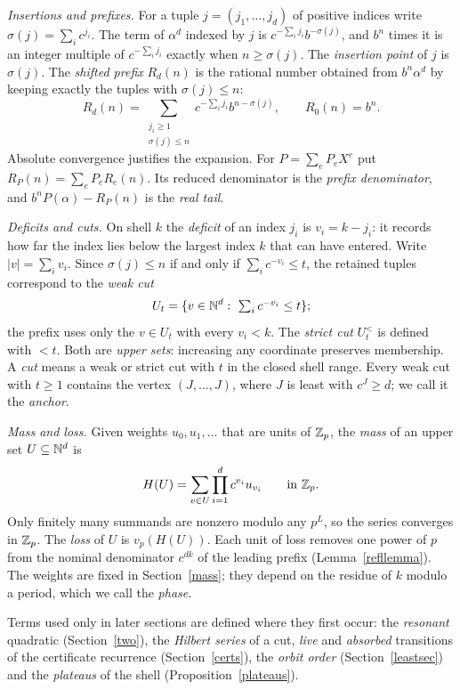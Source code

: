 \documentclass[11pt]{article}
\begin{document}
\emph{Insertions and prefixes.} For a tuple \(j=(j_1,\ldots,j_d)\) of
positive indices write \(\sigma(j)=\sum_i c^{j_i}\). The term of
\(\alpha^d\) indexed by \(j\) is \(c^{-\sum_ij_i}b^{-\sigma(j)}\), and
\(b^n\) times it is an integer multiple of \(c^{-\sum_ij_i}\) exactly when
\(n\ge\sigma(j)\). The \emph{insertion point} of \(j\) is \(\sigma(j)\).
The \emph{shifted prefix} \(R_d(n)\) is the rational number obtained from
\(b^n\alpha^d\) by keeping exactly the tuples with \(\sigma(j)\le n\):
\[
 R_d(n)=\sum_{\substack{j_i\ge1\\\sigma(j)\le n}}
             c^{-\sum_i j_i} b^{n-\sigma(j)},\qquad R_0(n)=b^n .
\]
Absolute convergence justifies the expansion. For \(P=\sum_e P_e X^e\)
put \(R_P(n)=\sum_e P_e R_e(n)\). Its reduced denominator is the
\emph{prefix denominator}, and \(b^nP(\alpha)-R_P(n)\) is the
\emph{real tail}.

\emph{Deficits and cuts.} On shell \(k\) the \emph{deficit} of an index
\(j_i\) is \(v_i=k-j_i\): it records how far the index lies below the
largest index \(k\) that can have entered. Write \(|v|=\sum_iv_i\). Since
\(\sigma(j)\le n\) if and only if \(\sum_ic^{-v_i}\le t\), the retained
tuples correspond to the \emph{weak cut}
\[
 U_t=\{v\in\mathbb N^d:\ \textstyle\sum_i c^{-v_i}\le t\};
\]
the prefix uses only the \(v\in U_t\) with every \(v_i<k\). The
\emph{strict cut} \(U_t^{<}\) is defined with \(<t\). Both are
\emph{upper sets}: increasing any coordinate preserves membership. A
\emph{cut} means a weak or strict cut with \(t\) in the closed shell
range. Every weak cut with \(t\ge1\) contains the vertex
\((J,\ldots,J)\), where \(J\) is least with \(c^J\ge d\); we call it the
\emph{anchor}.

\emph{Mass and loss.} Given weights \(u_0,u_1,\ldots\) that are units of
\(\mathbb Z_p\), the \emph{mass} of an upper set \(U\subseteq\mathbb N^d\) is
\[
 H(U)=\sum_{v\in U}\prod_{i=1}^d c^{v_i}u_{v_i}\qquad\text{in }\mathbb Z_p .
\]
Only finitely many summands are nonzero modulo any \(p^L\), so the series
converges in \(\mathbb Z_p\). The \emph{loss} of \(U\) is \(v_p(H(U))\). Each unit
of loss removes one power of \(p\) from the nominal denominator
\(c^{dk}\) of the leading prefix (Lemma~\ref{refllemma}). The weights are
fixed in Section~\ref{mass}; they depend on the residue of \(k\) modulo a
period, which we call the \emph{phase}.

Terms used only in later sections are defined where they first occur:
the \emph{resonant} quadratic (Section~\ref{two}), the \emph{Hilbert
series} of a cut, \emph{live} and \emph{absorbed} transitions of the
certificate recurrence (Section~\ref{certs}), the \emph{orbit order}
(Section~\ref{leastsec}) and the \emph{plateaus} of the shell
(Proposition~\ref{plateaus}).
\end{document}
